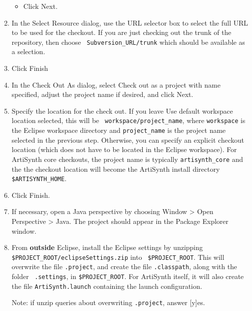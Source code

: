 \documentclass{article}
\def\SEP{/}
\def\directory{directory }
\begin{document}
\begin{enumerate}
\begin{itemize}
\item Click {\sf Next}.

\end{itemize}

\item In the {\sf Select Resource} dialog, use the {\sf URL} selector
box to select the full URL to be used for the checkout. If you are
just checking out the trunk of the repository, then choose {\tt
Subversion\_URL/trunk} which should be available as a selection.

\item Click {\sf Finish}

\item In the {\sf Check Out As} dialog, select {\sf Check out as a
project with name specified}, adjust the project name if desired,
and click {\sf Next}.

\item Specify the location for the check out. If you leave {\sf Use
default workspace location} selected, this will be {\tt
workspace/project\_name}, where {\tt workspace} is the Eclipse
workspace \directory and {\tt project\_name} is the project name
selected in the previous step. Otherwise, you can specify an explicit
checkout location (which does not have to be located in the Eclipse
workspace). For ArtiSynth core checkouts, the project name is
typically {\tt artisynth\_core} and the the checkout location will
become the ArtiSynth install \directory {\tt \$ARTISYNTH\_HOME}.

\item Click {\sf Finish}.

\item If necessary, open a Java perspective by choosing {\sf Window >
Open Perspective > Java}. The project should appear in the {\sf
Package Explorer} window.

\item From {\bf outside} Eclipse, install the Eclipse settings by
unzipping {\tt \$PROJECT\_ROOT\SEP eclipse\-Settings.zip} into {\tt
\$PROJECT\_ROOT}. This will overwrite the file {\tt .project}, and
create the file {\tt .classpath}, along with the folder {\tt
.settings}, in {\tt \$PROJECT\_ROOT}.  For ArtiSynth itself, it will
also create the file {\tt ArtiSynth.launch} containing the launch
configuration.

\begin{sideblock}
Note: if unzip queries about overwriting {\tt .project}, answer [y]es.
\end{sideblock}


\end{enumerate}
\end{document}
